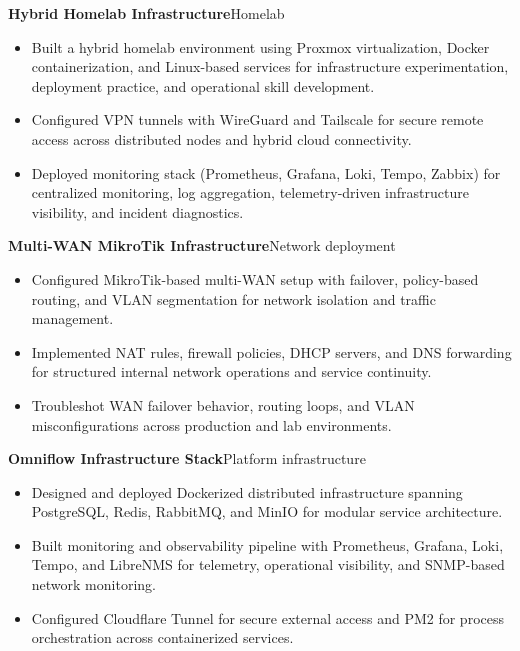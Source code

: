 
\textbf{Hybrid Homelab Infrastructure}\hfill {\color{SecondaryText}\small Homelab}\par
\begin{itemize}
  \item Built a hybrid homelab environment using Proxmox virtualization, Docker containerization, and Linux-based services for infrastructure experimentation, deployment practice, and operational skill development.
  \item Configured VPN tunnels with WireGuard and Tailscale for secure remote access across distributed nodes and hybrid cloud connectivity.
  \item Deployed monitoring stack (Prometheus, Grafana, Loki, Tempo, Zabbix) for centralized monitoring, log aggregation, telemetry-driven infrastructure visibility, and incident diagnostics.
\end{itemize}

\newpage
\textbf{Multi-WAN MikroTik Infrastructure}\hfill {\color{SecondaryText}\small Network deployment}\par
\begin{itemize}
  \item Configured MikroTik-based multi-WAN setup with failover, policy-based routing, and VLAN segmentation for network isolation and traffic management.
  \item Implemented NAT rules, firewall policies, DHCP servers, and DNS forwarding for structured internal network operations and service continuity.
  \item Troubleshot WAN failover behavior, routing loops, and VLAN misconfigurations across production and lab environments.
\end{itemize}

\textbf{Omniflow Infrastructure Stack}\hfill {\color{SecondaryText}\small Platform infrastructure}\par
\begin{itemize}
  \item Designed and deployed Dockerized distributed infrastructure spanning PostgreSQL, Redis, RabbitMQ, and MinIO for modular service architecture.
  \item Built monitoring and observability pipeline with Prometheus, Grafana, Loki, Tempo, and LibreNMS for telemetry, operational visibility, and SNMP-based network monitoring.
  \item Configured Cloudflare Tunnel for secure external access and PM2 for process orchestration across containerized services.
\end{itemize}

